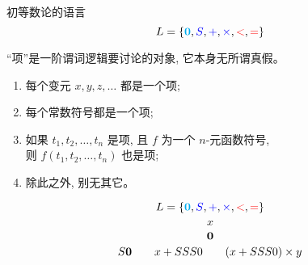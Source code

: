 \begin{frame}{}
  \begin{center}
    初等数论的语言
    \[
      L = \{\textbf{\textcolor{cyan}{0}}, \textcolor{blue}{S}, \textcolor{blue}{+}, \textcolor{blue}{\times}, \textcolor{red}{<}, \textcolor{red}{=}\}
    \]
  \end{center}
\end{frame}

\begin{frame}{}
  \begin{center}
    ``项''是一阶谓词逻辑要讨论的对象, 它本身无所谓真假。
  \end{center}

  \begin{definition}[项 (Term)]
    \begin{enumerate}[(1)]
      \setlength{\itemsep}{8pt}
      \item 每个变元 $x, y, z, \dots$ 都是一个项;
      \item 每个常数符号都是一个项;
      \item 如果 $t_{1}, t_{2}, \dots, t_{n}$ 是项,
        且 $f$ 为一个 $n$-元函数符号, \\
        则 $f(t_{1}, t_{2}, \dots, t_{n})$ 也是项;
      \item 除此之外, 别无其它。
    \end{enumerate}
  \end{definition}
  \[
    L = \{\textbf{\textcolor{cyan}{0}}, \textcolor{blue}{S}, \textcolor{blue}{+}, \textcolor{blue}{\times}, \textcolor{red}{<}, \textcolor{red}{=}\}
  \]
  \[
    x
  \]
  \[
    {\bf 0}
  \]
  \[
    S{\bf 0} \qquad x + SSS0 \qquad (x + SSS0) \times y
  \]
\end{frame}

